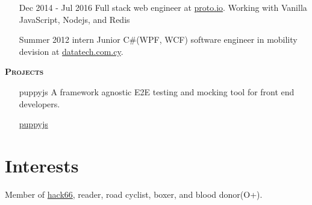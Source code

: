 \documentclass[margin, 11pt]{res} %
\begin{document}
\begin{resume}
\begin{itemize}
            \item[Dec 2014 - Jul 2016] Full stack web engineer at \href{https://proto.io/}{proto.io}.
            Working with Vanilla JavaScript, Nodejs, and Redis

            \item[Summer 2012 intern] Junior C\#(WPF, WCF) software engineer in mobility devision at \href{http://www.datatech.com.cy/}{datatech.com.cy}.

        \end{itemize}

        \textsc{ \textbf{Projects}}

        \begin{itemize}

            \item[puppyjs] A framework agnostic E2E testing and mocking tool for front end developers.

            \href{https://github.com/michaelthe/puppyjs}{puppyjs}

        \end{itemize}

        \section{Interests}\label{sec:interests}

        Member of \href{http://hack66.info/}{hack66}, reader, road cyclist, boxer, and blood donor(O+).

    \end{resume}
\end{document}
